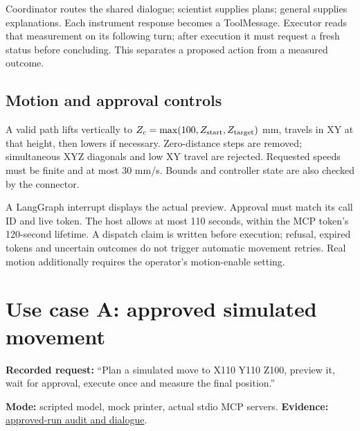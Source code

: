 \documentclass[11pt,a4paper]{article}
\newcommand{\evidence}[2]{\href{https://github.com/Arenananyan/photonicsai-homework-3/tree/main/docs/evidence/#1}{#2}}
\begin{document}
Coordinator routes the shared dialogue; scientist supplies plans; general supplies
explanations. Each instrument response becomes a ToolMessage. Executor reads that
measurement on its following turn; after execution it must request a fresh status
before concluding. This separates a proposed action from a measured outcome.

\subsection{Motion and approval controls}
A valid path lifts vertically to $Z_c=\max(100,Z_{\rm start},Z_{\rm target})$ mm,
travels in XY at that height, then lowers if necessary. Zero-distance steps are
removed; simultaneous XYZ diagonals and low XY travel are rejected. Requested
speeds must be finite and at most 30 mm/s. Bounds and controller state are also
checked by the connector.

A LangGraph interrupt displays the actual preview. Approval must match its call ID
and live token. The host allows at most 110 seconds, within the MCP token's
120-second lifetime. A dispatch claim is written before execution; refusal,
expired tokens and uncertain outcomes do not trigger automatic movement retries.
Real motion additionally requires the operator's motion-enable setting.

\newpage
\section{Use case A: approved simulated movement}
\textbf{Recorded request:} ``Plan a simulated move to X110 Y110 Z100, preview it,
wait for approval, execute once and measure the final position.''

\textbf{Mode:} scripted model, mock printer, actual stdio MCP servers.
\textbf{Evidence:} \evidence{simulation-approved}{approved-run audit and dialogue}.
\end{document}

